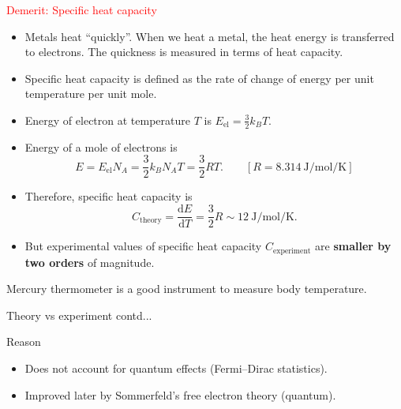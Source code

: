 %
\begin{frame}{\textcolor{red}{Demerit: Specific heat capacity}}
\begin{footnotesize}
		\begin{itemize}
		\item Metals heat ``quickly''. When we heat a metal, the heat energy is transferred to electrons. The quickness is measured in terms of heat capacity.
		\item Specific heat capacity is defined as the rate of change of energy per unit temperature per unit mole.
		\item Energy of electron at temperature \(T\) is
		\(
		E_\mathrm{el} = \frac{3}{2} k_B T.
		\)
		\item Energy of a mole of electrons is
		\[
		E = E_\mathrm{el} N_A =  \frac{3}{2} k_B N_A T  = \frac{3}{2} R T. \qquad \left[R = \SI{8.314}{\joule\per\mole\per\kelvin} \right]
		\]
		\item Therefore, specific heat capacity is
		\[
		C_\mathrm{theory} = \frac{\mathrm{d} E}{\mathrm{d} T} = \frac{3}{2} R \sim \SI{12}{\joule\per\mole\per\kelvin}.
		\]
		\item But experimental values of specific heat capacity \(C_\mathrm{experiment}\) are \textbf{smaller by two orders} of magnitude.
	\end{itemize}
\end{footnotesize}
%
\begin{keyinsight}
	Mercury thermometer is a good instrument to measure body temperature.
\end{keyinsight}
%
\end{frame}
%
%
\begin{frame}{Theory vs experiment contd...}
	\begin{block}{Reason}
		\begin{itemize}
			\item  Does not account for quantum effects (Fermi–Dirac statistics).
			\item Improved later by Sommerfeld's free electron theory (quantum).
		\end{itemize}
	\end{block}
\end{frame}
